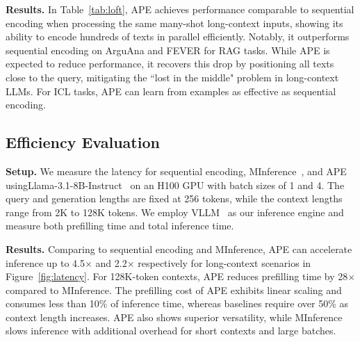 \textbf{Results.} In Table~\ref{tab:loft}, APE achieves performance comparable to sequential encoding when processing the same many-shot long-context inputs, showing its ability to encode hundreds of texts in parallel efficiently. Notably, it outperforms sequential encoding on ArguAna and FEVER for RAG tasks. While APE is expected to reduce performance, it recovers this drop by positioning all texts close to the query, mitigating the ``lost in the middle" problem in long-context LLMs. For ICL tasks, APE can learn from examples as effective as sequential encoding.

\subsection{Efficiency Evaluation}
\label{sec:efficiency}



\textbf{Setup.} We measure the latency for sequential encoding, MInference~\citep{jiang2024minference}, and APE usingLlama-3.1-8B-Instruct~\citep{llama3} on an H100 GPU with batch sizes of 1 and 4. The query and generation lengths are fixed at 256 tokens, while the context lengths range from 2K to 128K tokens. We employ VLLM~\citep{kwon2023efficient} as our inference engine and measure both prefilling time and total inference time.

\textbf{Results.} Comparing to sequential encoding and MInference,  APE can accelerate inference up to 4.5$\times$ and 2.2$\times$ respectively for long-context scenarios in Figure~\ref{fig:latency}. For 128K-token contexts, APE reduces prefilling time by 28$\times$ compared to MInference. The prefilling cost of APE exhibits linear scaling and consumes less than 10\% of inference time, whereas baselines require over 50\% as context length increases. APE also shows superior versatility, while MInference slows inference with additional overhead for short contexts and large batches.